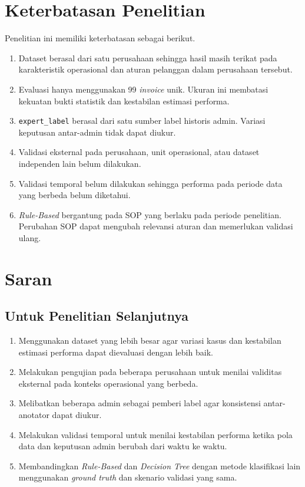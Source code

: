 \section{Keterbatasan Penelitian}

Penelitian ini memiliki keterbatasan sebagai berikut.

\begin{enumerate}
    \item Dataset berasal dari satu perusahaan sehingga hasil masih terikat pada karakteristik operasional dan aturan pelanggan dalam perusahaan tersebut.
    \item Evaluasi hanya menggunakan 99 \textit{invoice} unik. Ukuran ini membatasi kekuatan bukti statistik dan kestabilan estimasi performa.
    \item \texttt{expert\_label} berasal dari satu sumber label historis admin. Variasi keputusan antar-admin tidak dapat diukur.
    \item Validasi eksternal pada perusahaan, unit operasional, atau dataset independen lain belum dilakukan.
    \item Validasi temporal belum dilakukan sehingga performa pada periode data yang berbeda belum diketahui.
    \item \textit{Rule-Based} bergantung pada SOP yang berlaku pada periode penelitian. Perubahan SOP dapat mengubah relevansi aturan dan memerlukan validasi ulang.
\end{enumerate}

\section{Saran}

\subsection{Untuk Penelitian Selanjutnya}

\begin{enumerate}
    \item Menggunakan dataset yang lebih besar agar variasi kasus dan kestabilan estimasi performa dapat dievaluasi dengan lebih baik.
    \item Melakukan pengujian pada beberapa perusahaan untuk menilai validitas eksternal pada konteks operasional yang berbeda.
    \item Melibatkan beberapa admin sebagai pemberi label agar konsistensi antar-anotator dapat diukur.
    \item Melakukan validasi temporal untuk menilai kestabilan performa ketika pola data dan keputusan admin berubah dari waktu ke waktu.
    \item Membandingkan \textit{Rule-Based} dan \textit{Decision Tree} dengan metode klasifikasi lain menggunakan \textit{ground truth} dan skenario validasi yang sama.
\end{enumerate}

